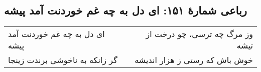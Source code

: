 \begin{center}
\section*{رباعی شمارهٔ ۱۵۱: ای دل به چه غم خوردنت آمد پیشه}
\label{sec:151}
\begin{longtable}{l p{0.5cm} r}
ای دل به چه غم خوردنت آمد پیشه
&&
وز مرگ چه ترسی، چو درخت از تیشه
\\
گر زانکه به ناخوشی برندت زینجا
&&
خوش باش که رستی ز هزار اندیشه
\\
\end{longtable}
\end{center}
